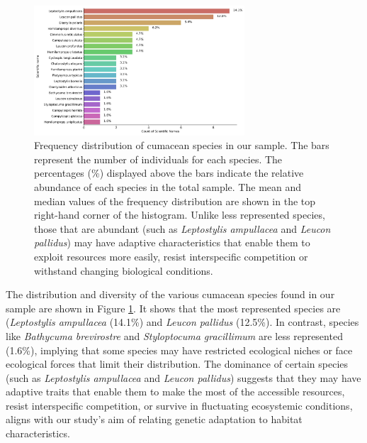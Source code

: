 \begin{figure}[htbp]
    \centering
    \includegraphics[width=0.7\textwidth]{figure2.jpg}
    \caption{Frequency distribution of cumacean species in our sample. The bars represent the number of individuals for each species. The percentages (\%) displayed above the bars indicate the relative abundance of each species in the total sample. The mean and median values of the frequency distribution are shown in the top right-hand corner of the histogram. Unlike less represented species, those that are abundant (such as \emph{Leptostylis ampullacea} and \emph{Leucon pallidus}) may have adaptive characteristics that enable them to exploit resources more easily, resist interspecific competition or withstand changing biological conditions. \label{fig:fig3}}
\end{figure}

The distribution and diversity of the various cumacean species found in our sample are shown in Figure \ref{fig:fig3}. It shows that the most represented species are (\emph{Leptostylis ampullacea} (14.1\%) and \emph{Leucon pallidus} (12.5\%). In contrast, species like \emph{Bathycuma brevirostre} and \emph{Styloptocuma gracillimum} are less represented (1.6\%), implying that some species may have restricted ecological niches or face ecological forces that limit their distribution. The dominance of certain species (such as \emph{Leptostylis ampullacea} and \emph{Leucon pallidus}) suggests that they may have adaptive traits that enable them to make the most of the accessible resources, resist interspecific competition, or survive in fluctuating ecosystemic conditions, aligns with our study’s aim of relating genetic adaptation to habitat characteristics. 

